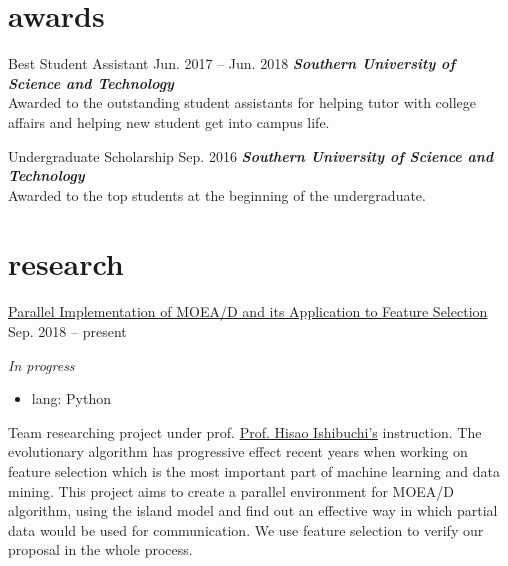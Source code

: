 \documentclass[hidelinks__VERSION__]{adamyi-cv}
\begin{document}
\section{awards}

\begin{entrylist}


\entry
{Best Student Assistant}
{Jun. 2017 -- Jun. 2018}
{\emph{\textbf{Southern University of Science and Technology}}\\
Awarded to the outstanding student assistants for helping tutor with college affairs and helping new student get into campus life.
}


\entry
{Undergraduate Scholarship}
{Sep. 2016}
{\emph{\textbf{Southern University of Science and Technology}}\\
Awarded to the top students at the beginning of the undergraduate.
}


\end{entrylist}


\section{research}

\begin{entrylist}


\entry
{\href{https://github.com/hackroid/pMOEA-D}{Parallel Implementation of MOEA/D and its Application to Feature Selection}}
{Sep. 2018 -- present}
{\emph{In progress}
\begin{itemize}
    \item lang: Python
\end{itemize}
Team researching project under prof. \href{http://cse.sustech.edu.cn/en/people/view/people_id/55/sort_id/9/pid/}{Prof. Hisao Ishibuchi's} instruction. The evolutionary algorithm has progressive effect recent years when working on feature selection which is the most important part of machine learning and data mining. This project aims to create a parallel environment for MOEA/D algorithm, using the island model and find out an effective way in which partial data would be used for communication. We use feature selection to verify our proposal in the whole process.
}


\end{entrylist}
\end{document}
